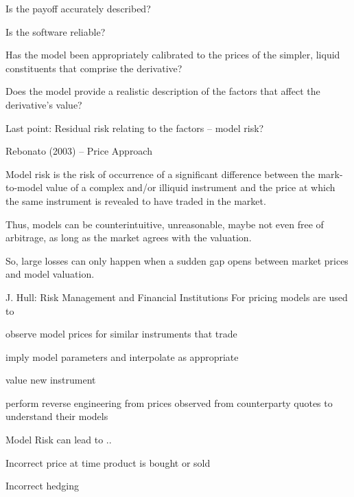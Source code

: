 	Is the payoff accurately described?


	Is the software reliable?


	Has the model been appropriately calibrated to the prices of the simpler, liquid constituents that comprise the derivative?


	Does the model provide a realistic description of the factors that affect the derivative's value?




Last point: Residual risk relating to the factors -- model risk?

{Rebonato (2003) -- Price Approach}







	Model risk is the risk of occurrence of a significant difference between the mark-to-model value of a complex and/or illiquid instrument and the price at which the same instrument is revealed to have traded in the market.


	Thus, models can be counterintuitive, unreasonable, maybe not even free of arbitrage, as long as the market agrees with the valuation.


	So, large losses  can only happen when a sudden gap opens between market prices and model valuation.





{J. Hull: Risk Management and Financial Institutions}
For pricing models are used to






	observe model prices for similar instruments that trade


	imply model parameters and interpolate as appropriate


	value new instrument


	perform reverse engineering from prices observed from counterparty quotes to understand their models




Model Risk can lead to ..






	
Incorrect price at time product is bought or sold


	Incorrect hedging





